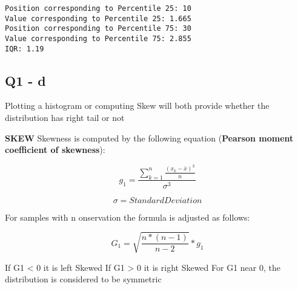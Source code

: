\documentclass[11pt]{article}
\begin{document}
    \begin{Verbatim}[commandchars=\\\{\}]
Position corresponding to Percentile 25: 10
Value corresponding to Percentile 25: 1.665
Position corresponding to Percentile 75: 30
Value corresponding to Percentile 75: 2.855
IQR: 1.19

    \end{Verbatim}

    \subsection{Q1 - d}\label{q1---d}

    Plotting a histogram or computing Skew will both provide whether the
distribution has right tail or not

\textbf{SKEW} Skewness is computed by the following equation
(\textbf{Pearson moment coefficient of skewness}):

\begin{equation*} g_1 = {\frac{ \sum_{k=1}^n \frac{(x_k - \bar{x})^3} {n}} {\sigma^3}} \end{equation*}

\begin{equation*} \sigma = Standard Deviation\end{equation*}

For samples with n onservation the formula is adjusted as follows:

\begin{equation*} G_1 = \sqrt{\frac{n * (n - 1)} {n - 2}} * g_1\end{equation*}

If G1 \textless{} 0 it is left Skewed If G1 \textgreater{} 0 it is right
Skewed For G1 near 0, the distribution is considered to be symmetric
\end{document}
